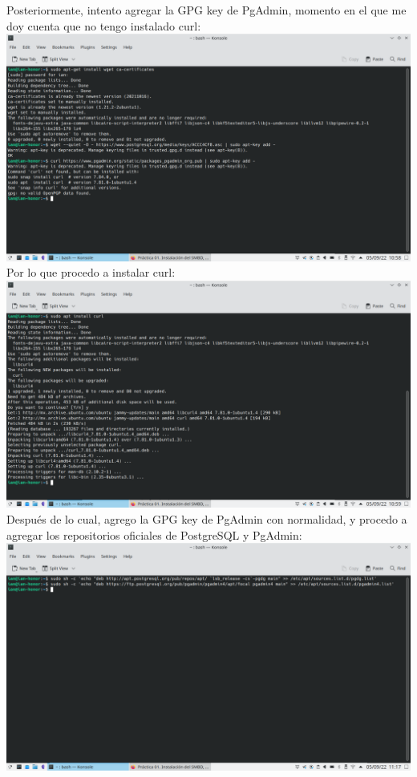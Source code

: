 \documentclass[12pt,a4paper]{article}
\begin{document}
\begin{enumerate}
        Posteriormente, intento agregar la GPG key de PgAdmin, momento en el que me doy cuenta que no tengo instalado curl:\\
        \includegraphics[scale=0.3]{assets/ian_2.png}\\

        Por lo que procedo a instalar curl:\\
        \includegraphics[scale=0.3]{assets/ian_3.png}\\

        Después de lo cual, agrego la GPG key de PgAdmin con normalidad, y procedo a agregar los repositorios oficiales de PostgreSQL y PgAdmin:\\
        \includegraphics[scale=0.3]{assets/ian_4.png}\\


\end{enumerate}
\end{document}
